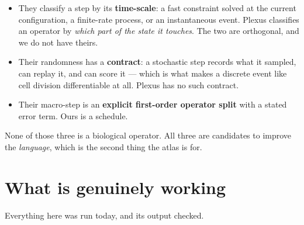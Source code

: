 \documentclass[11pt,a4paper]{article}
\begin{document}
\begin{itemize}
\item They classify a step by its \textbf{time-scale}: a fast constraint solved at the current
configuration, a finite-rate process, or an instantaneous event. Plexus classifies an operator by
\emph{which part of the state it touches}. The two are orthogonal, and we do not have theirs.
\item Their randomness has a \textbf{contract}: a stochastic step records what it sampled, can
replay it, and can score it --- which is what makes a discrete event like cell division
differentiable at all. Plexus has no such contract.
\item Their macro-step is an \textbf{explicit first-order operator split} with a stated error
term. Ours is a schedule.
\end{itemize}

None of those three is a biological operator. All three are candidates to improve the
\emph{language}, which is the second thing the atlas is for.

\section{What is genuinely working}

Everything here was run today, and its output checked.
\end{document}
